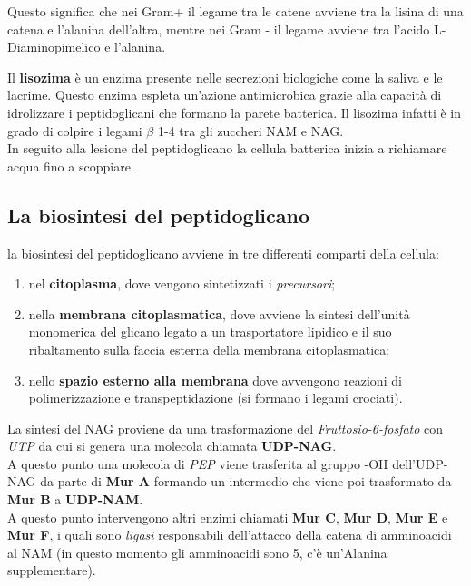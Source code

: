 \documentclass[11pt]{book}
\begin{document}
Questo significa che nei Gram+ il legame tra le catene avviene tra la lisina di una catena e l’alanina dell’altra, mentre nei Gram - il legame avviene tra l’acido L-Diaminopimelico e l’alanina.

\vspace{2em}
Il \textbf{lisozima} è un enzima presente nelle secrezioni biologiche come la saliva e le lacrime.
Questo enzima espleta un'azione antimicrobica grazie alla capacità di idrolizzare i peptidoglicani che formano la parete batterica. Il lisozima infatti è in grado di colpire i legami $\beta$ 1-4 tra gli zuccheri NAM e NAG.\\
In seguito alla lesione del peptidoglicano la cellula batterica inizia a richiamare acqua fino a scoppiare.


\subsection{La biosintesi del peptidoglicano}

la biosintesi del peptidoglicano avviene in tre differenti comparti della cellula:
\begin{enumerate}
\item nel \textbf{citoplasma}, dove vengono sintetizzati i \emph{precursori};
\item nella \textbf{membrana citoplasmatica}, dove avviene la sintesi dell’unità monomerica del glicano legato a un trasportatore lipidico e il suo ribaltamento sulla faccia esterna della membrana citoplasmatica;
\item nello \textbf{spazio esterno alla membrana} dove avvengono reazioni di polimerizzazione e transpeptidazione (si formano i legami crociati).
\end {enumerate}

La sintesi del NAG proviene da una trasformazione del \emph{Fruttosio-6-fosfato} con \emph{UTP} da cui si genera una molecola chiamata \textbf{UDP-NAG}.\\
A questo punto una molecola di \emph{PEP} viene trasferita al gruppo -OH dell’UDP-NAG da parte di \textbf{Mur A} formando un intermedio che viene poi trasformato da \textbf{Mur B} a \textbf{UDP-NAM}. \\
A questo punto intervengono altri enzimi chiamati \textbf{Mur C}, \textbf{Mur D}, \textbf{Mur E} e \textbf{Mur F}, i quali sono \emph{ligasi} responsabili dell’attacco della catena di amminoacidi al NAM (in questo momento gli amminoacidi sono 5, c’è un’Alanina supplementare).
\end{document}
